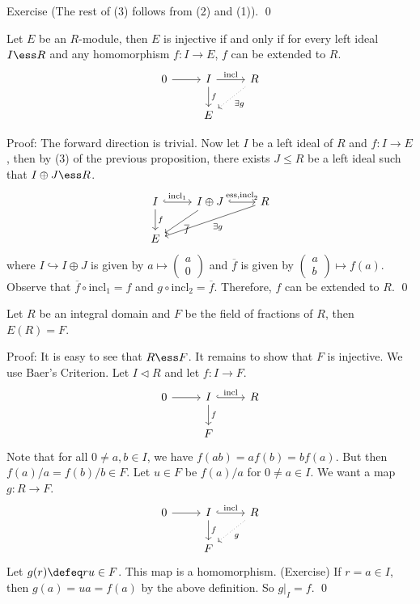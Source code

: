 Exercise (The rest of (3) follows from (2) and (1)). \qed \\

\begin{thm}\label{mbc}
Let $E$ be an $R$-module, then $E$ is injective if and only if for every left ideal $I \ess R$ and any homomorphism $f: I \rightarrow E$, $f$ can be extended to $R$.
\[
\begin{tikzcd}
0 \arrow{r} & I \arrow{r}{\text{incl}} \arrow{d}{f} & R \arrow[dotted]{dl}{\exists g} \\
& E & 
\end{tikzcd}
\]
\end{thm}

Proof: The forward direction is trivial. Now let $I$ be a left ideal of $R$ and $f: I \rightarrow E$, then by (3) of the previous proposition, there exists $J \leq R$ be a left ideal such that $I \oplus J \ess R$.
\[
\begin{tikzcd}
I \arrow[hookrightarrow]{r}{\text{incl}_1} \arrow{d}{f} & I \oplus J \arrow[hookrightarrow]{r}{\text{ess,incl}_2} \arrow{dl}{\overline{f}} & R \arrow{dll}{\exists g} \\
E
\end{tikzcd}
\]
where $I \hookrightarrow I \oplus J$ is given by $a \mapsto \begin{pmatrix} a \\ 0 \end{pmatrix}$ and $\overline{f}$ is given by $\begin{pmatrix} a \\ b \end{pmatrix} \mapsto f(a)$. Observe that $\overline{f} \circ \text{incl}_1=f$ and $g \circ \text{incl}_2=\overline{f}$. Therefore, $f$ can be extended to $R$. \qed \\

\begin{prop}
Let $R$ be an integral domain and $F$ be the field of fractions of $R$, then $E(R)=F$. 
\end{prop}

Proof: It is easy to see that $R \ess F$. It remains to show that $F$ is injective. We use Baer's Criterion. Let $I \lhd R$ and let $f: I \rightarrow F$.
\[
\begin{tikzcd}
0 \arrow{r} & I \arrow{d}{f} \arrow[hookrightarrow]{r}{\text{incl}} & R \\
& F & 
\end{tikzcd}
\]
Note that for all $0 \neq a,b \in I$, we have $f(ab)=af(b)=bf(a)$. But then $f(a)/a=f(b)/b \in F$. Let $u \in F$ be $f(a)/a$ for $0 \neq a \in I$. We want a map $g: R \rightarrow F$.
\[
\begin{tikzcd}
0 \arrow{r} & I \arrow{d}{f} \arrow[hookrightarrow]{r}{\text{incl}} & R \arrow[dotted]{dl}{g} \\
 & F & 
\end{tikzcd}
\]
Let $g(r) \defeq ru \in F$. This map is a homomorphism. (Exercise) If $r=a \in I$, then $g(a)=ua=f(a)$ by the above definition. So $g|_I=f$. \qed \\

